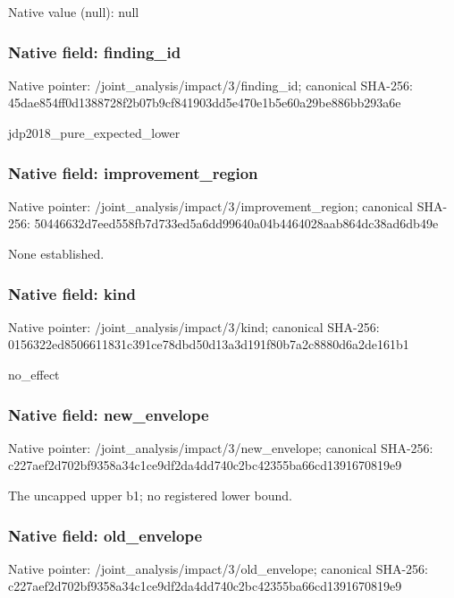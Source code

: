 \documentclass[10pt,a4paper]{article}
\begin{document}
Native value (null): null

\subsubsection{Native field: finding\_\allowbreak{}id}
Native pointer: /joint\_\allowbreak{}analysis/impact/3/finding\_\allowbreak{}id; canonical SHA-256: 45dae854ff0d1388728f2b07b9cf841903dd5e470e1b5e60a29be886bb293a6e

\begingroup\raggedright\sloppy jdp2018\_\allowbreak{}pure\_\allowbreak{}expected\_\allowbreak{}lower\par\endgroup

\subsubsection{Native field: improvement\_\allowbreak{}region}
Native pointer: /joint\_\allowbreak{}analysis/impact/3/improvement\_\allowbreak{}region; canonical SHA-256: 50446632d7eed558fb7d733ed5a6dd99640a04b4464028aab864dc38ad6db49e

\begingroup\raggedright\sloppy None established.\par\endgroup

\subsubsection{Native field: kind}
Native pointer: /joint\_\allowbreak{}analysis/impact/3/kind; canonical SHA-256: 0156322ed8506611831c391ce78dbd50d13a3d191f80b7a2c8880d6a2de161b1

\begingroup\raggedright\sloppy no\_\allowbreak{}effect\par\endgroup

\subsubsection{Native field: new\_\allowbreak{}envelope}
Native pointer: /joint\_\allowbreak{}analysis/impact/3/new\_\allowbreak{}envelope; canonical SHA-256: c227aef2d702bf9358a34c1ce9df2da4dd740c2bc42355ba66cd1391670819e9

\begingroup\raggedright\sloppy The uncapped upper b1;\allowbreak{} no registered lower bound.\par\endgroup

\subsubsection{Native field: old\_\allowbreak{}envelope}
Native pointer: /joint\_\allowbreak{}analysis/impact/3/old\_\allowbreak{}envelope; canonical SHA-256: c227aef2d702bf9358a34c1ce9df2da4dd740c2bc42355ba66cd1391670819e9
\end{document}
